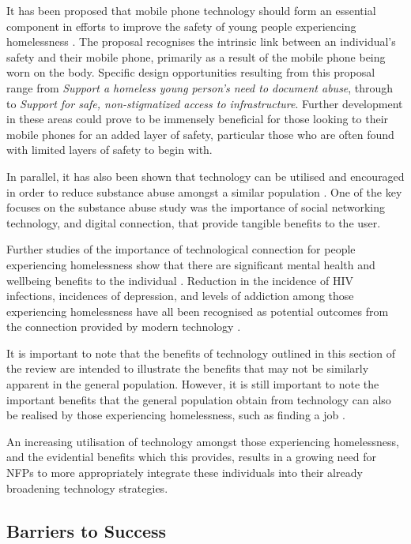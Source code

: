 It has been proposed that mobile phone technology should form an essential component in efforts to improve the safety of young people experiencing homelessness \cite{woelfer2011improving}. The proposal recognises the intrinsic link between an individual's safety and their mobile phone, primarily as a result of the mobile phone being worn on the body. Specific design opportunities resulting from this proposal range from \emph{Support a homeless young person’s need to document abuse}, through to \emph{Support for safe, non-stigmatized access to infrastructure}. Further development in these areas could prove to be immensely beneficial for those looking to their mobile phones for an added layer of safety, particular those who are often found with limited layers of safety to begin with.

In parallel, it has also been shown that technology can be utilised and encouraged in order to reduce substance abuse amongst a similar population \cite{rice2011social}. One of the key focuses on the substance abuse study was the importance of social networking technology, and digital connection, that provide tangible benefits to the user.

Further studies of the importance of technological connection for people experiencing homelessness show that there are significant mental health and wellbeing benefits to the individual \cite{rice2011social} \cite{eyrich2010mobile} \cite{roberson2010survival}. Reduction in the incidence of HIV infections, incidences of depression, and levels of addiction among those experiencing homelessness have all been recognised as potential outcomes from the connection provided by modern technology \cite{sala2014benefits}.

It is important to note that the benefits of technology outlined in this section of the review are intended to illustrate the benefits that may not be similarly apparent in the general population. However, it is still important to note the important benefits that the general population obtain from technology can also be realised by those experiencing homelessness, such as finding a job \cite{le2008feature}.

An increasing utilisation of technology amongst those experiencing homelessness, and the evidential benefits which this provides, results in a growing need for NFPs to more appropriately integrate these individuals into their already broadening technology strategies.

\subsection{Barriers to Success}

